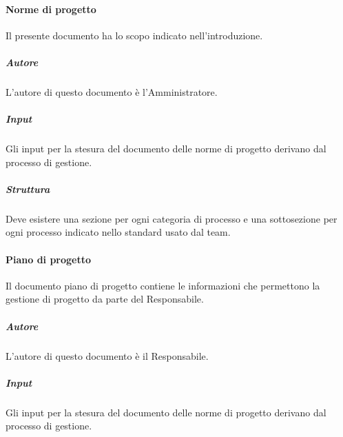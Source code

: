 \paragraph{Norme di progetto}
Il presente documento ha lo scopo indicato nell'introduzione.

\subparagraph{Autore} 
L'autore di questo documento è l'Amministratore.

\subparagraph{Input}
Gli input per la stesura del documento delle norme di progetto derivano dal processo di gestione.

\subparagraph{Struttura}
Deve esistere una sezione per ogni categoria di processo e una sottosezione per ogni processo indicato nello standard  usato dal team.

\paragraph{Piano di progetto}
Il documento piano di progetto contiene le informazioni che permettono la gestione di progetto da parte del Responsabile.

\subparagraph{Autore} 
L’autore di questo documento è il Responsabile.

\subparagraph{Input}
Gli input per la stesura del documento delle norme di progetto derivano dal processo di gestione.

